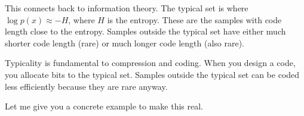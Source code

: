 \vspace{1em}

This connects back to information theory. The typical set is where $\log p(x) \approx -H$, where $H$ is the entropy. These are the samples with code length close to the entropy. Samples outside the typical set have either much shorter code length (rare) or much longer code length (also rare).

\vspace{1em}

Typicality is fundamental to compression and coding. When you design a code, you allocate bits to the typical set. Samples outside the typical set can be coded less efficiently because they are rare anyway.

\vspace{2em}

Let me give you a concrete example to make this real.

\vspace{1.5em}

